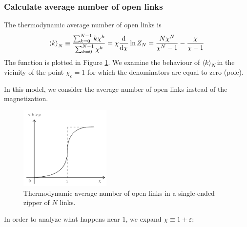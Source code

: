\documentclass[../main/main.tex]{subfiles}
\begin{document}
\subsubsection{Calculate average number of open links}
The thermodynamic average number of open links is
\begin{equation}
  \expval{k}_N \equiv  \frac{\sum_{k=0}^{N-1} k \chi^k}{\sum_{k=0}^{N-1} \chi^k } = \chi \dv[]{}{\chi} \ln{Z_N}  = \frac{N \chi^N}{\chi^N-1} - \frac{\chi}{\chi-1}
\end{equation}
The function is plotted in Figure \ref{fig:9_3}. We examine the behaviour of \( \expval{k}_N \)in the vicinity of the point \( \chi_c = 1 \) for which the denominators are equal to zero (pole).
\begin{remark}
In this model, we consider the average number of open links instead of the magnetization.
\end{remark}

\begin{figure}[h!]
\centering
\includegraphics[width=0.4\textwidth]{../lessons/9_image/3.pdf}
\caption{\label{fig:9_3} Thermodynamic average number of open links in a single-ended zipper of \(N\) links.}
\end{figure}

 In order to analyze what happens near 1, we expand \( \chi \equiv 1+\varepsilon  \):
\end{document}
